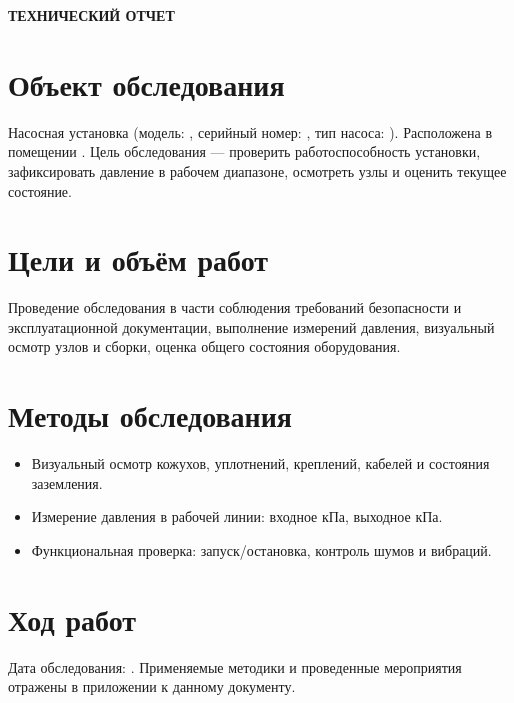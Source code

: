 \documentclass[12pt]{article}
\begin{document}
\begin{center}
\textbf{\LARGE ТЕХНИЧЕСКИЙ ОТЧЕТ}
\end{center}

\vspace{1cm}

\section*{Объект обследования}
Насосная установка (модель: \underline{\hspace{2.5cm}}, серийный номер: \underline{\hspace{2.5cm}}, тип насоса: \underline{\hspace{2.5cm}}). Расположена в помещении \underline{\hspace{3cm}}. Цель обследования — проверить работоспособность установки, зафиксировать давление в рабочем диапазоне, осмотреть узлы и оценить текущее состояние.

\section*{Цели и объём работ}
Проведение обследования в части соблюдения требований безопасности и эксплуатационной документации, выполнение измерений давления, визуальный осмотр узлов и сборки, оценка общего состояния оборудования.

\section*{Методы обследования}
\begin{itemize}
\item Визуальный осмотр кожухов, уплотнений, креплений, кабелей и состояния заземления.
\item Измерение давления в рабочей линии: входное \underline{\hspace{2.5cm}} кПа, выходное \underline{\hspace{2.5cm}} кПа.
\item Функциональная проверка: запуск/остановка, контроль шумов и вибраций.
\end{itemize}

\section*{Ход работ}
Дата обследования: \underline{\hspace{3cm}}. Применяемые методики и проведенные мероприятия отражены в приложении к данному документу.
\end{document}
